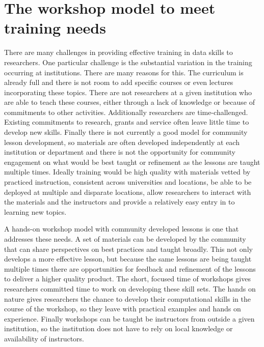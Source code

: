\documentclass[15]{idcc}
\begin{document}
\section{The workshop model to meet training needs}

There are many challenges in providing effective training in data skills to researchers. One particular challenge is
the substantial variation in the training occurring at institutions. There are many reasons for this. The curriculum
is already full and there is not room to add specific courses or even lectures incorporating these topics. There are
not researchers at a given institution who are able to teach these courses, either through a lack of knowledge
or because of commitments to other activities. Additionally researchers are time-challenged. Existing commitments to research, grants and service often leave little time to develop new skills. Finally
there is not currently a good model for community lesson development, so materials are often developed independently at
each institution or department and there is not the opportunity for community engagement on what would be best taught or
refinement as the lessons are taught multiple times.
Ideally training would
be high quality with materials vetted by practiced instruction, consistent across universities and locations, be able
to be deployed at multiple and disparate locations, allow researchers to interact with the materials and the
instructors and provide a relatively easy entry in to learning new topics.

A hands-on workshop model with community developed lessons is one that addresses these needs. A set of materials can be developed by the community that can share perspectives on best practices and taught broadly. This not only develops a more effective lesson, but
because the same lessons are being taught multiple times there are opportunities for feedback and refinement of the lessons to deliver a higher quality product. The short, focused time of workshops gives researchers committed time to work on developing these skill
sets. The hands on nature gives researchers the chance to develop their computational skills in the course of the workshop, so they
leave with practical examples and hands on experience. Finally workshops can be taught be instructors from outside a given institution, so the institution does not have to rely on local knowledge or availability of instructors.
\end{document}
